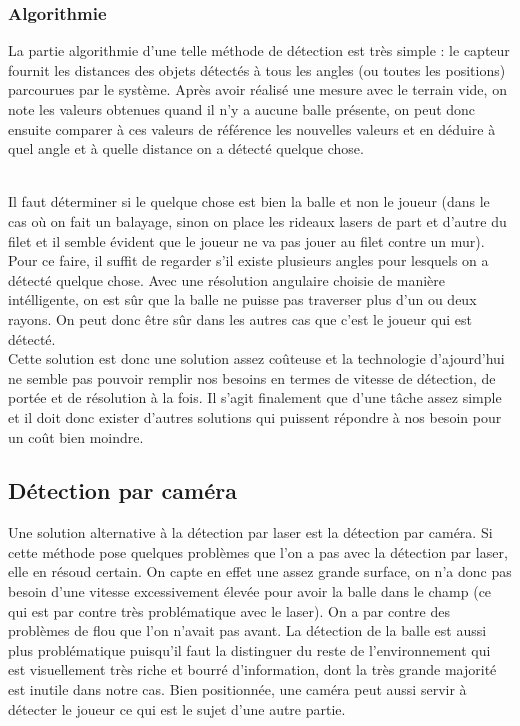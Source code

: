 \subsubsection{Algorithmie}

La partie algorithmie d'une telle méthode de détection est très simple : le capteur fournit les distances des objets détectés à tous les angles (ou toutes les positions) parcourues par le système. Après avoir réalisé une mesure avec le terrain vide, on note les valeurs obtenues quand il n'y a aucune balle présente, on peut donc ensuite comparer à ces valeurs de référence les nouvelles valeurs et en déduire à quel angle et à quelle distance on a détecté quelque chose. \\ 

Il faut déterminer si le quelque chose est bien la balle et non le joueur (dans le cas où on fait un balayage, sinon on place les rideaux lasers de part et d'autre du filet et il semble évident que le joueur ne va pas jouer au filet contre un mur). Pour ce faire, il suffit de regarder s'il existe plusieurs angles pour lesquels on a détecté quelque chose. Avec une résolution angulaire choisie de manière intélligente, on est sûr que la balle ne puisse pas traverser plus d'un ou deux rayons. On peut donc être sûr dans les autres cas que c'est le joueur qui est détecté.\\ 

Cette solution est donc une solution assez coûteuse et la technologie d'ajourd'hui ne semble pas pouvoir remplir nos besoins en termes de vitesse de détection, de portée et de résolution à la fois. Il s'agit finalement que d'une tâche assez simple et il doit donc exister d'autres solutions qui puissent répondre à nos besoin pour un coût bien moindre. 


\subsection{Détection par caméra}

Une solution alternative à la détection par laser est la détection par caméra. Si cette méthode pose quelques problèmes que l'on a pas avec la détection par laser, elle en résoud certain. On capte en effet une assez grande surface, on n'a donc pas besoin d'une vitesse excessivement élevée pour avoir la balle dans le champ (ce qui est par contre très problématique avec le laser). On a par contre des problèmes de flou que l'on n'avait pas avant. La détection de la balle est aussi plus problématique puisqu'il faut la distinguer du reste de l'environnement qui est visuellement très riche et bourré d'information, dont la très grande majorité est inutile dans notre cas. Bien positionnée, une caméra peut aussi servir à détecter le joueur ce qui est le sujet d'une autre partie. \\ 

